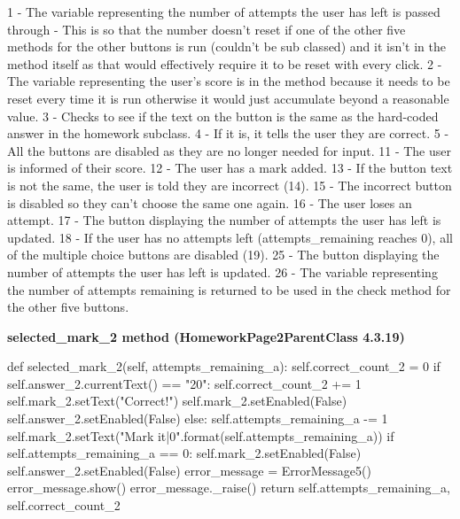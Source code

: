1 - The variable representing the number of attempts the user has left is passed through - This is so that the number doesn't reset if one of the other five methods for the other buttons is run (couldn't be sub classed) and it isn't in the method itself as that would effectively require it to be reset with every click.
2 - The variable representing the user's score is in the method because it needs to be reset every time it is run otherwise it would just accumulate beyond a reasonable value.
3 - Checks to see if the text on the button is the same as the hard-coded answer in the homework subclass.
4 - If it is, it tells the user they are correct.
5 - All the buttons are disabled as they are no longer needed for input.
11 - The user is informed of their score.
12 - The user has a mark added.
13 - If the button text is not the same, the user is told they are incorrect (14).
15 - The incorrect button is disabled so they can't choose the same one again.
16 - The user loses an attempt.
17 - The button displaying the number of attempts the user has left is updated.
18 - If the user has no attempts left (attempts\_remaining reaches 0), all of the multiple choice buttons are disabled (19).
25 - The button displaying the number of attempts the user has left is updated.
26 - The variable representing the number of attempts remaining is returned to be used in the check method for the other five buttons.

\textbf{selected\_mark\_2 method (HomeworkPage2ParentClass 4.3.19)}

\begin{python}
def selected_mark_2(self, attempts_remaining_a):
        self.correct_count_2 = 0
        if self.answer_2.currentText() == "20":
            self.correct_count_2 += 1
            self.mark_2.setText("Correct!")
            self.mark_2.setEnabled(False)
            self.answer_2.setEnabled(False)
        else:
            self.attempts_remaining_a -= 1
            self.mark_2.setText("Mark it|{0}".format(self.attempts_remaining_a))
            if self.attempts_remaining_a == 0:
                self.mark_2.setEnabled(False)
                self.answer_2.setEnabled(False)
            error_message = ErrorMessage5()
            error_message.show()
            error_message._raise()
        return self.attempts_remaining_a, self.correct_count_2
\end{python}

